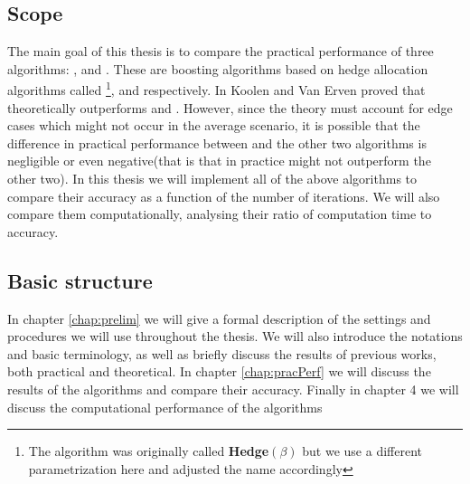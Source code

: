 \subsection{Scope}
The main goal of this thesis is to compare the practical performance of three algorithms: \adaB, \NHB and \squintB. These are boosting algorithms based on hedge allocation algorithms called \hedge\footnote{The algorithm was originally called \textbf{Hedge}$(\beta)$ but we use a different parametrization here and adjusted the name accordingly}, \adaN and \squint respectively. In \cite{Koolen2015} Koolen and Van Erven proved that \squint theoretically outperforms \hedge and \adaN. However, since the theory must account for edge cases which might not occur in the average scenario, it is possible that the difference in practical performance between \squint and the other two algorithms is negligible or even negative(that is that in practice \squintB might not outperform the other two). In this thesis we will implement all of the above algorithms to compare their accuracy as a function of the number of iterations. We will also compare them computationally, analysing their ratio of computation time to accuracy.  

\subsection{Basic structure}
In chapter \ref{chap:prelim} we will give a formal description of the settings and procedures we will use throughout the thesis. We will also introduce the notations and basic terminology, as well as briefly discuss the results of previous works, both practical and theoretical. In chapter \ref{chap:pracPerf} we will discuss the results of the algorithms and compare their accuracy. Finally in chapter 4 we will discuss the computational performance of the algorithms    

